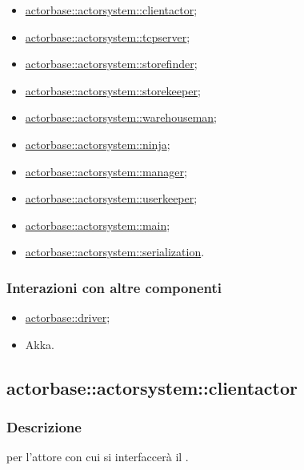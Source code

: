 \documentclass{scalatekids-article}
\begin{document}
\begin{itemize}
\item \hyperref[sec:actorbase::actorsystem::clientactor]{actorbase::actorsystem::clientactor};
\item \hyperref[sec:actorbase::actorsystem::tcpserver]{actorbase::actorsystem::tcpserver};
\item \hyperref[sec:actorbase::actorsystem::storefinder]{actorbase::actorsystem::storefinder};
\item \hyperref[sec:actorbase::actorsystem::storekeeper]{actorbase::actorsystem::storekeeper};
\item \hyperref[sec:actorbase::actorsystem::warehouseman]{actorbase::actorsystem::warehouseman};
\item \hyperref[sec:actorbase::actorsystem::ninja]{actorbase::actorsystem::ninja};
\item \hyperref[sec:actorbase::actorsystem::manager]{actorbase::actorsystem::manager};
\item \hyperref[sec:actorbase::actorsystem::userkeeper]{actorbase::actorsystem::userkeeper};
\item \hyperref[sec:actorbase::actorsystem::main]{actorbase::actorsystem::main};
\item \hyperref[sec:actorbase::actorsystem::serialization]{actorbase::actorsystem::serialization}.
\end{itemize}

\subsubsection{Interazioni con altre componenti}

\begin{itemize}
\item \hyperref[sec:actorbase::driver]{actorbase::driver};
\item Akka.
\end{itemize}

\subsection{actorbase::actorsystem::clientactor}
\label{sec:actorbase::actorsystem::clientactor}

\subsubsection{Descrizione}

 per l'attore con cui si interfaccerà il .
\end{document}
